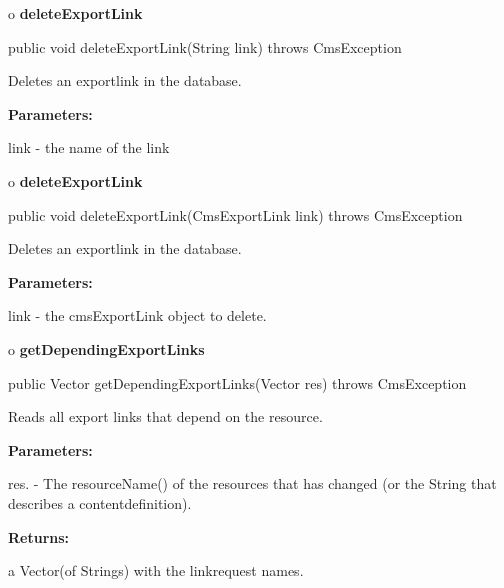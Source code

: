 o {\bf deleteExportLink} 

\begin{PRE}
 public void deleteExportLink(String link) throws CmsException
\end{PRE}

\begin{description}
\htmlDD Deletes an exportlink in the database. 

\begin{description}
\item {\bf Parameters:}  

link - the name of the link  
\end{description}

\end{description}

o {\bf deleteExportLink} 

\begin{PRE}
 public void deleteExportLink(CmsExportLink link) throws CmsException
\end{PRE}

\begin{description}
\htmlDD Deletes an exportlink in the database. 

\begin{description}
\item {\bf Parameters:}  

link - the cmsExportLink object to delete.  
\end{description}

\end{description}

o {\bf getDependingExportLinks} 

\begin{PRE}
 public Vector getDependingExportLinks(Vector res) throws CmsException
\end{PRE}

\begin{description}
\htmlDD Reads all export links that depend on the resource. 

\begin{description}
\item {\bf Parameters:}  

res. - The resourceName() of the resources that has changed (or the String 
that describes a contentdefinition).  
\item {\bf Returns:}  

a Vector(of Strings) with the linkrequest names.  
\end{description}

\end{description}

